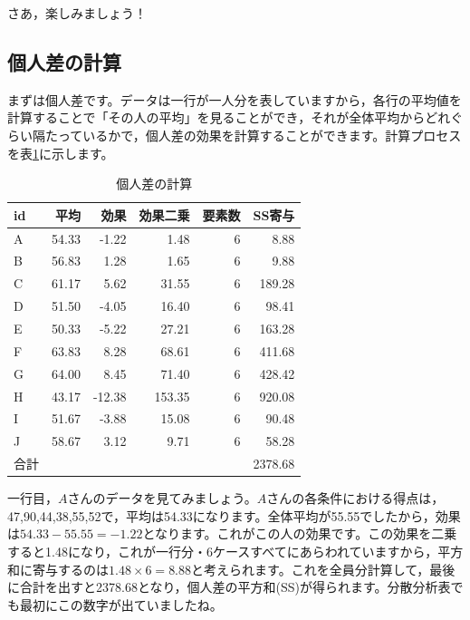 \documentclass{ltjbook}
\begin{document}
さあ，楽しみましょう！

\subsection{個人差の計算}
まずは個人差です。データは一行が一人分を表していますから，各行の平均値を計算することで「その人の平均」を見ることができ，それが全体平均からどれぐらい隔たっているかで，個人差の効果を計算することができます。計算プロセスを表\ref{tbl:21_06}に示します。

\begin{table}[ht]
\centering
\caption{個人差の計算}
\begin{tabular}{lrrrrr}
  \hline
id & 平均 & 効果 & 効果二乗 & 要素数 & SS寄与 \\
  \hline
A & 54.33 & -1.22 & 1.48 & 6 & 8.88 \\
B & 56.83 & 1.28 & 1.65 & 6 & 9.88 \\
C & 61.17 & 5.62 & 31.55 & 6 & 189.28 \\
D & 51.50 & -4.05 & 16.40 & 6 & 98.41 \\
E & 50.33 & -5.22 & 27.21 & 6 & 163.28 \\
F & 63.83 & 8.28 & 68.61 & 6 & 411.68 \\
G & 64.00 & 8.45 & 71.40 & 6 & 428.42 \\
H & 43.17 & -12.38 & 153.35 & 6 & 920.08 \\
I & 51.67 & -3.88 & 15.08 & 6 & 90.48 \\
J & 58.67 & 3.12 & 9.71 & 6 & 58.28 \\
  \hline
合計 &  &  &  &  & 2378.68 \\
   \hline
\end{tabular}
\label{tbl:21_06}
\end{table}

一行目，$A$さんのデータを見てみましょう。$A$さんの各条件における得点は，47,90,44,38,55,52で，平均は54.33になります。全体平均が55.55でしたから，効果は$54.33-55.55=-1.22$となります。これがこの人の効果です。この効果を二乗すると1.48になり，これが一行分・6ケースすべてにあらわれていますから，平方和に寄与するのは$1.48\times 6=8.88$と考えられます。これを全員分計算して，最後に合計を出すと2378.68となり，個人差の平方和(SS)が得られます。分散分析表でも最初にこの数字が出ていましたね。
\end{document}

